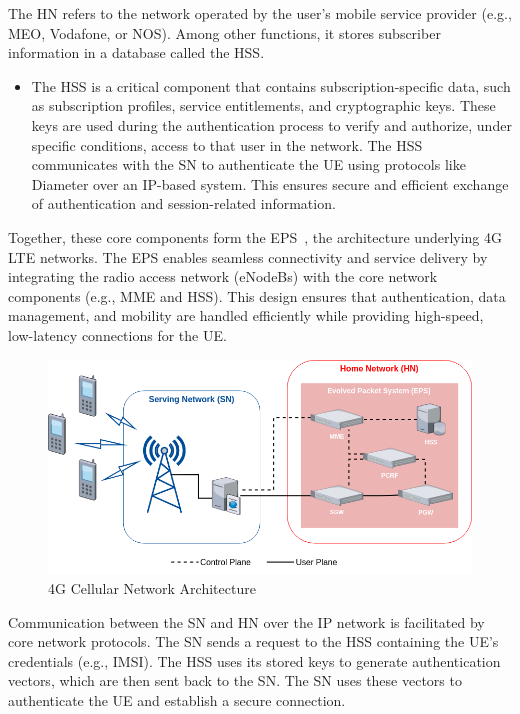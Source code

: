 The \ac{HN} refers to the network operated by the user's mobile service provider (e.g., MEO, Vodafone, or NOS). Among other functions, it stores subscriber information in a database called the \ac{HSS}.

\begin{itemize}
    \item {
        The \ac{HSS} is a critical component that contains subscription-specific data, such as subscription profiles, service entitlements, and cryptographic keys. These keys are used during the authentication process to verify and authorize, under specific conditions, access to that user in the network. The \ac{HSS} communicates with the \ac{SN} to authenticate the \ac{UE} using protocols like Diameter over an IP-based system. This ensures secure and efficient exchange of authentication and session-related information.
    }
\end{itemize}

Together, these core components form the \ac{EPS}~\cite{cbl-comp-p3}, the architecture underlying \ac{4G} \ac{LTE} networks. The \ac{EPS} enables seamless connectivity and service delivery by integrating the radio access network (\acp{eNodeB}) with the core network components (e.g., \ac{MME} and \ac{HSS}). This design ensures that authentication, data management, and mobility are handled efficiently while providing high-speed, low-latency connections for the \ac{UE}.

\begin{figure}
    \centering
    \includegraphics[width=0.75\linewidth]{figs/4G Cellular Network Architecture.png}
    \caption{\acs{4G} Cellular Network Architecture}
    \label{fig:4G Cellular Network Architecture}
\end{figure}

Communication between the \ac{SN} and \ac{HN} over the IP network is facilitated by core network protocols. The \ac{SN} sends a request to the \ac{HSS} containing the \ac{UE}’s credentials (e.g., \ac{IMSI}). The \ac{HSS} uses its stored keys to generate authentication vectors, which are then sent back to the \ac{SN}. The \ac{SN} uses these vectors to authenticate the \ac{UE} and establish a secure connection.

